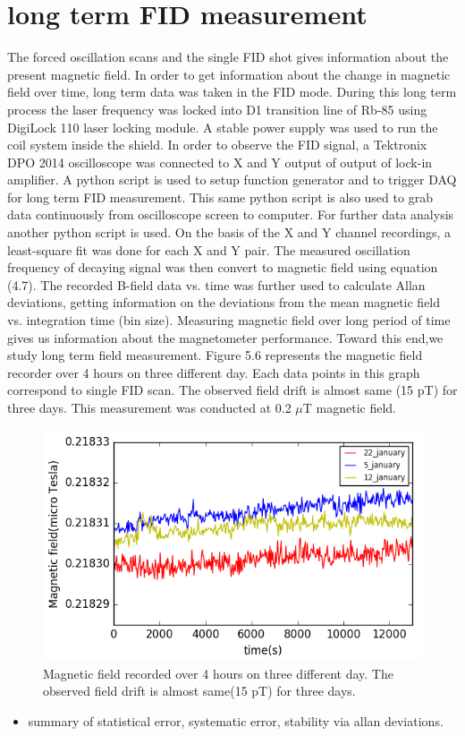  \section{long term FID measurement}  
The forced oscillation scans and the single FID shot gives information about the present magnetic field. In order to get information about the change in magnetic field over time, long term data was taken in the FID mode. During this long term process the laser frequency was locked into D1 transition line of Rb-85 using DigiLock 110 laser locking module. A stable power supply was used to run the coil system inside the shield. In order to observe the FID signal, a Tektronix DPO 2014 oscilloscope was connected to X and Y output of output of lock-in amplifier. A python script is used to setup function generator and to trigger DAQ for long term FID measurement. This same python script is also used to grab data continuously from oscilloscope screen to computer. For further data analysis  another python script is used. On the basis of the X
and Y channel recordings, a least-square fit was done for each X and Y pair. The measured oscillation frequency of decaying signal was then convert to magnetic field using equation (4.7). The recorded B-field data vs. time was further used to calculate Allan deviations, getting  information on the deviations from the mean magnetic field vs. integration time (bin size). Measuring magnetic field over long period of time gives us information about the magnetometer performance. Toward this end,we study long term field measurement. Figure 5.6 represents the magnetic field recorder over 4 hours on three different day. Each data points in this graph correspond to single FID scan. The observed field drift is almost same (15 pT) for three days. This measurement was conducted at 0.2 $\mu$T magnetic field.
\begin{figure}[h]
\centering\includegraphics[width=0.85\linewidth]{figures/field_3_day}
\caption{Magnetic field recorded over 4 hours on three different day. The observed field drift is almost same(15 pT) for three days.}
\end{figure}
   \begin{itemize}
   \item summary of statistical error, systematic error, stability via allan deviations.
   \end{itemize}
   \newpage
